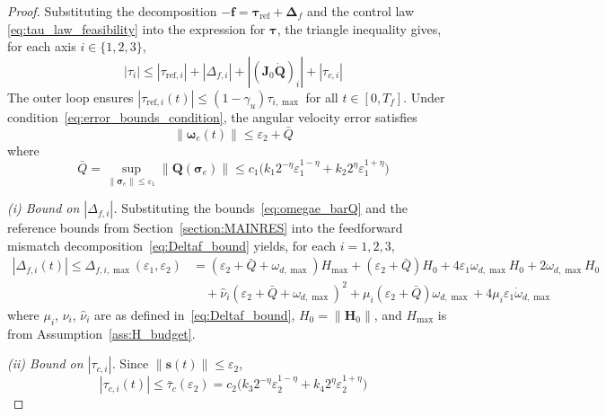 \documentclass[journal]{new-aiaa}
\begin{document}
\begin{proof}
Substituting the decomposition $-\boldsymbol{f} = \boldsymbol{\tau}_{\mathrm{ref}} + \boldsymbol{\Delta}_f$
and the control law \eqref{eq:tau_law_feasibility} into the expression for $\boldsymbol{\tau}$, the triangle inequality gives,
for each axis $i\in\{1,2,3\}$,
\begin{equation}
|\tau_i| \le |\tau_{\mathrm{ref},i}| + |\Delta_{f,i}| + |(\boldsymbol{J}_0\dot{\boldsymbol{Q}})_i| + |\tau_{c,i}|
\label{eq:tau_axis_triangle}
\end{equation}
The outer loop ensures $|\tau_{\mathrm{ref},i}(t)|\le (1-\gamma_u)\tau_{i,\max}$ for all $t\in[0,T_f]$.
Under condition~\eqref{eq:error_bounds_condition}, the angular velocity error satisfies
\begin{equation}
\|\boldsymbol{\omega}_e(t)\| \le \varepsilon_2 + \bar Q
\label{eq:wemax}
\end{equation}
where
\begin{equation}
\bar Q = \sup_{\|\boldsymbol{\sigma}_e\|\le\varepsilon_1}\|\boldsymbol{Q}(\boldsymbol{\sigma}_e)\|
\le c_1\big(k_1 2^{-\eta}\varepsilon_1^{1-\eta} + k_2 2^{\eta}\varepsilon_1^{1+\eta}\big)
\label{eq:omegae_barQ}
\end{equation}

\emph{(i) Bound on $|\Delta_{f,i}|$.}
Substituting the bounds~\eqref{eq:omegae_barQ} and the reference bounds from Section~\ref{section:MAINRES}
into the feedforward mismatch decomposition~\eqref{eq:Deltaf_bound} yields,
for each $i=1,2,3$,
\begin{align}
|\Delta_{f,i}(t)|\le \Delta_{f,i,\max}(\varepsilon_1,\varepsilon_2)
&= (\varepsilon_2+\bar Q+\omega_{d,\max})H_{\max}
+(\varepsilon_2+\bar Q)H_0
+4\varepsilon_1\omega_{d,\max}H_0
+2\omega_{d,\max}H_0 \nonumber \\
&\quad +\hat\nu_i(\varepsilon_2+\bar Q+\omega_{d,\max})^2
+\mu_i(\varepsilon_2+\bar Q)\omega_{d,\max}
+4\mu_i\varepsilon_1\dot\omega_{d,\max}
\label{eq:Deltaf_i_envelope_inproof}
\end{align}
where $\mu_i$, $\nu_i$, $\hat\nu_i$ are as defined in~\eqref{eq:Deltaf_bound},
$H_0 = \|\boldsymbol{H}_0\|$, and $H_{\max}$ is from Assumption~\ref{ass:H_budget}.

\emph{(ii) Bound on $|\tau_{c,i}|$.}
Since $\|\boldsymbol{s}(t)\|\le \varepsilon_2$,
\begin{equation}
|\tau_{c,i}(t)|
\le \bar\tau_c(\varepsilon_2) =
c_2\big(k_3 2^{-\eta}\varepsilon_2^{1-\eta} + k_4 2^{\eta}\varepsilon_2^{1+\eta}\big)
\label{eq:thm4_tauc_bar_compact2}
\end{equation}


\end{proof}
\end{document}
